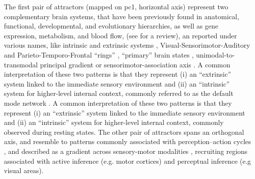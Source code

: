 \documentclass{article}
\begin{document}
The first pair of attractors (mapped on \acrshort{pc}1, horizontal axis) represent two complementary brain systems, that have been previously found in anatomical, functional, developmental, and evolutionary hierarchies, as well as gene expression, metabolism, and blood flow, (see \cite{sydnor2021neurodevelopment} for a review), an reported under various names, like intrinsic and extrinsic systems \citep{golland2008data}, Visual-Sensorimotor-Auditory and Parieto-Temporo-Frontal ``rings'' \citep{cioli2014differences}, ``primary'' brain states \citep{chen2018human}, unimodal-to-transmodal principal gradient \citep{margulies2016situating, huntenburg2018large} or sensorimotor-association axis \citep{sydnor2021neurodevelopment}.
A common interpretation of these two patterns is that they represent (i) an ``extrinsic'' system linked to the immediate sensory environment and (ii) an ``intrinsic'' system for higher-level internal context, commonly referred to as the default mode network \citep{raichle2001default}.
A common interpretation of these two patterns is that they represent (i) an ``extrinsic'' system linked to the immediate sensory environment and (ii) an ``intrinsic'' system for higher-level internal context, commonly observed during resting states.
The other pair of attractors spans an orthogonal axis, and resemble to patterns commonly associated with perception--action cycles \citep{fuster2004upper}, and described as a gradient across sensory-motor modalities \citep{huntenburg2018large}, recruiting regions associated with active inference (e.g. motor cortices) and perceptual inference (e.g visual areas).
\end{document}
